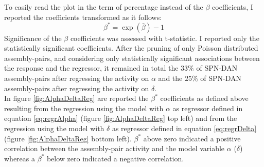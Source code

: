 To easily read the plot in the term of percentage instead of the $\beta$ coefficients, I reported the coefficients transformed as it follows:
\begin{equation}
    \beta^* = \exp(\bar{\beta})-1
    \label{eq:BetaPlot}
\end{equation}
Significance of the $\beta$ coefficients was assessed with t-statistic. I reported only the statistically significant coefficients. After the pruning of only Poisson distributed assembly-pairs, and considering only statistically significant associations between the response and the regressor, it remained in total the $33\%$ of SPN-DAN assembly-pairs after regressing the activity on $\alpha$ and the $25\%$ of SPN-DAN assembly-pairs after regressing the activity on $\delta$.\\In figure \ref{fig:AlphaDeltaReg} are reported the $\beta^*$ coefficients as defined above resulting from the regression using the model with $\alpha$ as regressor defined in equation \ref{eq:regrAlpha} (figure \ref{fig:AlphaDeltaReg} top left) and from the regression using the model with $\delta$ as regressor defined in equation \ref{eq:regrDelta} (figure \ref{fig:AlphaDeltaReg} bottom left). $\beta^*$ above zero indicated a positive correlation between the assembly-pair activity and the model variable $\alpha$ ($\delta$) whereas a $\beta^*$ below zero indicated a negative correlation. 
